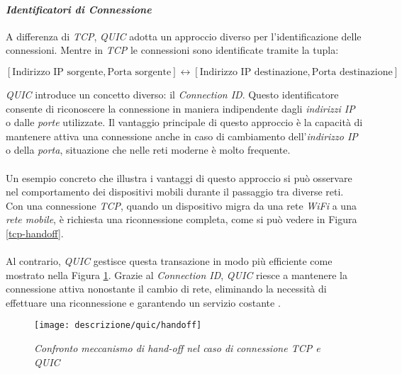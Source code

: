 \paragraph{\textit{Identificatori di Connessione}}
\noindent A differenza di \emph{TCP}, \emph{QUIC} adotta un approccio diverso per l'identificazione delle connessioni. 
Mentre in \emph{TCP} le connessioni sono identificate tramite la tupla:
\begin{center}
\small
$[\text{Indirizzo IP sorgente}, \text{Porta sorgente}] \leftrightarrow [\text{Indirizzo IP destinazione}, \text{Porta destinazione}]$
\end{center}
\emph{QUIC} introduce un concetto diverso: il \emph{Connection ID}. Questo identificatore consente di riconoscere la connessione in maniera indipendente dagli \emph{indirizzi IP} o dalle \emph{porte} utilizzate.
Il vantaggio principale di questo approccio è la capacità di mantenere attiva una connessione anche in caso di cambiamento dell'\emph{indirizzo IP} o della \emph{porta}, situazione che nelle reti moderne è molto frequente.
\\\\
Un esempio concreto che illustra i vantaggi di questo approccio si può osservare nel comportamento dei dispositivi mobili durante il passaggio tra diverse reti.
Con una connessione \emph{TCP}, quando un dispositivo migra da una rete \emph{WiFi} a una \emph{rete mobile}, è richiesta una riconnessione completa, come si può vedere in Figura \ref{tcp-handoff}. 
\\\\
Al contrario, \emph{QUIC} gestisce questa transazione in modo più efficiente come mostrato nella Figura \ref{quic-handoff}. Grazie al \emph{Connection ID}, \emph{QUIC} riesce a mantenere la connessione attiva nonostante il cambio di rete, eliminando la necessità di effettuare una riconnessione e garantendo un servizio costante \cite{site:Explaining-QUIC}.
\begin{figure}[!h]
    \centering
    \texttt{[image: descrizione/quic/handoff]}
    \caption{\emph{Confronto meccanismo di hand-off nel caso di connessione TCP e QUIC}}
    \label{handoff}
    \label{tcp-handoff}
    \label{quic-handoff}
    
\end{figure}

